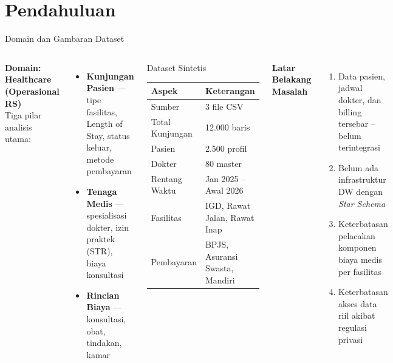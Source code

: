 \documentclass[xcolor=table,t,aspectratio=169]{beamer}
\begin{document}
\section{Pendahuluan}

\begin{frame}{Domain dan Gambaran Dataset}
  \footnotesize
  \begin{columns}[T]
    \textbf{Domain: Healthcare (Operasional RS)}\\[4pt]
    Tiga pilar analisis utama:
    \begin{itemize}
      \item \textbf{Kunjungan Pasien} --- tipe fasilitas, Length of Stay, status keluar, metode pembayaran
      \item \textbf{Tenaga Medis} --- spesialisasi dokter, izin praktek (STR), biaya konsultasi
      \item \textbf{Rincian Biaya} --- konsultasi, obat, tindakan, kamar
    \end{itemize}

    \vspace{6pt}
    \begin{block}{Dataset Sintetis}
      \tiny
      \begin{tabular}{@{}ll@{}}
        \toprule
        \textbf{Aspek} & \textbf{Keterangan} \\
        \midrule
        Sumber           & 3 file CSV \\
        Total Kunjungan  & 12.000 baris \\
        Pasien           & 2.500 profil \\
        Dokter           & 80 master \\
        Rentang Waktu    & Jan 2025 -- Awal 2026 \\
        Fasilitas        & IGD, Rawat Jalan, Rawat Inap \\
        Pembayaran       & BPJS, Asuransi Swasta, Mandiri \\
        \bottomrule
      \end{tabular}
    \end{block}

    \textbf{Latar Belakang Masalah}
    \begin{enumerate}
      \scriptsize
      \item Data pasien, jadwal dokter, dan billing tersebar -- belum terintegrasi
      \item Belum ada infrastruktur DW dengan \textit{Star Schema}
      \item Keterbatasan pelacakan komponen biaya medis per fasilitas
      \item Keterbatasan akses data riil akibat regulasi privasi
    \end{enumerate}


\end{columns}
\end{frame}
\end{document}
